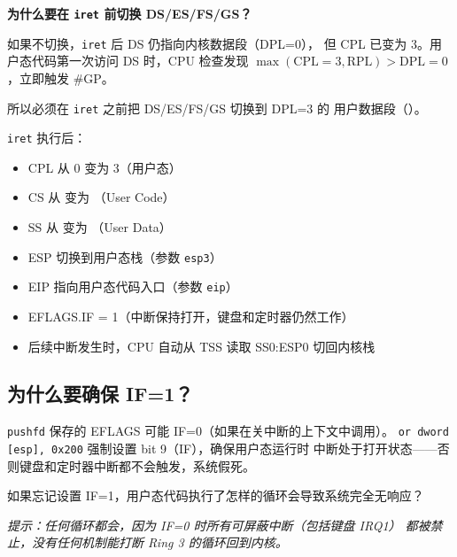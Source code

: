 \begin{warnbox}
\textbf{为什么要在 \texttt{iret} 前切换 DS/ES/FS/GS？}

如果不切换，\texttt{iret} 后 DS 仍指向内核数据段（DPL=0），
但 CPL 已变为 3。用户态代码第一次访问 DS 时，CPU 检查发现
$\max(\text{CPL}=3, \text{RPL}) > \text{DPL}=0$，立即触发 \#GP。

所以必须在 \texttt{iret} 之前把 DS/ES/FS/GS 切换到 DPL=3 的
用户数据段（）。
\end{warnbox}

\begin{cpustate}
\texttt{iret} 执行后：
\begin{itemize}
  \item CPL 从 0 变为 3（用户态）
  \item CS 从  变为 （User Code）
  \item SS 从  变为 （User Data）
  \item ESP 切换到用户态栈（参数 \texttt{esp3}）
  \item EIP 指向用户态代码入口（参数 \texttt{eip}）
  \item EFLAGS.IF = 1（中断保持打开，键盘和定时器仍然工作）
  \item 后续中断发生时，CPU 自动从 TSS 读取 SS0:ESP0 切回内核栈
\end{itemize}
\end{cpustate}

\subsection{为什么要确保 IF=1？}

\texttt{pushfd} 保存的 EFLAGS 可能 IF=0（如果在关中断的上下文中调用）。
\texttt{or dword [esp], 0x200} 强制设置 bit 9（IF），确保用户态运行时
中断处于打开状态——否则键盘和定时器中断都不会触发，系统假死。

\begin{thinkbox}
如果忘记设置 IF=1，用户态代码执行了怎样的循环会导致系统完全无响应？

\emph{提示：任何循环都会，因为 IF=0 时所有可屏蔽中断（包括键盘 IRQ1）
都被禁止，没有任何机制能打断 Ring 3 的循环回到内核。}
\end{thinkbox}
